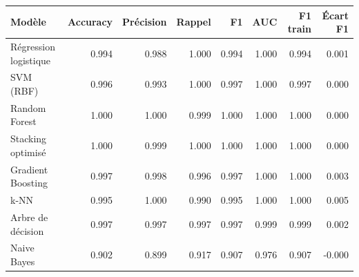 \begin{tabular}{lrrrrrrr}
\toprule
Modèle & Accuracy & Précision & Rappel & F1 & AUC & F1 train & Écart F1 \\
\midrule
Régression logistique & 0.994 & 0.988 & 1.000 & 0.994 & 1.000 & 0.994 & 0.001 \\
SVM (RBF) & 0.996 & 0.993 & 1.000 & 0.997 & 1.000 & 0.997 & 0.000 \\
Random Forest & 1.000 & 1.000 & 0.999 & 1.000 & 1.000 & 1.000 & 0.000 \\
Stacking optimisé & 1.000 & 0.999 & 1.000 & 1.000 & 1.000 & 1.000 & 0.000 \\
Gradient Boosting & 0.997 & 0.998 & 0.996 & 0.997 & 1.000 & 1.000 & 0.003 \\
k-NN & 0.995 & 1.000 & 0.990 & 0.995 & 1.000 & 1.000 & 0.005 \\
Arbre de décision & 0.997 & 0.997 & 0.997 & 0.997 & 0.999 & 0.999 & 0.002 \\
Naive Bayes & 0.902 & 0.899 & 0.917 & 0.907 & 0.976 & 0.907 & -0.000 \\
\bottomrule
\end{tabular}